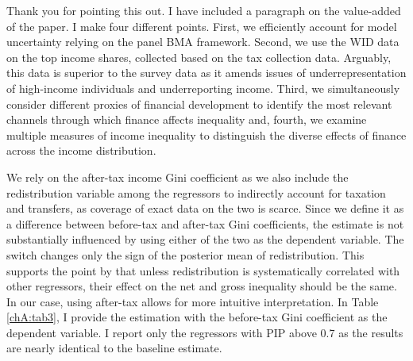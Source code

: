 \begin{enumerate}[resume]
    Thank you for pointing this out. I have included a paragraph on the value-added of the paper. I make four different points. First, we efficiently account for model uncertainty relying on the panel \ac{BMA} framework. Second, we use the \ac{WID} data on the top income shares, collected based on the tax collection data. Arguably, this data is superior to the survey data as it amends issues of underrepresentation of high-income individuals and underreporting income. Third, we simultaneously consider different proxies of financial development to identify the most relevant channels through which finance affects inequality and, fourth, we examine multiple measures of income inequality to distinguish the diverse effects of finance across the income distribution.
    
    
    We rely on the after-tax income Gini coefficient as we also include the redistribution variable among the regressors to indirectly account for taxation and transfers, as coverage of exact data on the two is scarce. Since we define it as a difference between before-tax and after-tax Gini coefficients, the estimate is not substantially influenced by using either of the two as the dependent variable. The switch changes only the sign of the posterior mean of redistribution. This supports the point by \textcite{furceri2019robust} that unless redistribution is systematically correlated with other regressors, their effect on the net and gross inequality should be the same. In our case, using after-tax allows for more intuitive interpretation. In Table \ref{chA:tab3}, I provide the estimation with the before-tax Gini coefficient as the dependent variable. I report only the regressors with \ac{PIP} above 0.7 as the results are nearly identical to the baseline estimate.


\end{enumerate}
